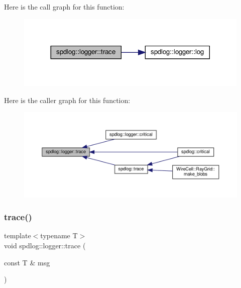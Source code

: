 Here is the call graph for this function\+:
\nopagebreak
\begin{figure}[H]
\begin{center}
\leavevmode
\includegraphics[width=317pt]{classspdlog_1_1logger_a59a8516fe055c6b78c9b1822148f78ec_cgraph}
\end{center}
\end{figure}
Here is the caller graph for this function\+:
\nopagebreak
\begin{figure}[H]
\begin{center}
\leavevmode
\includegraphics[width=350pt]{classspdlog_1_1logger_a59a8516fe055c6b78c9b1822148f78ec_icgraph}
\end{center}
\end{figure}
\mbox{\label{classspdlog_1_1logger_a66e008d30a46c33283c4546f3851a80a}} 
\subsubsection{\texorpdfstring{trace()}{trace()}\hspace{0.1cm}{\footnotesize\ttfamily [2/2]}}
{\footnotesize\ttfamily template$<$typename T$>$ \\
void spdlog\+::logger\+::trace (\begin{DoxyParamCaption}\item[{const T \&}]{msg }\end{DoxyParamCaption})\hspace{0.3cm}{\ttfamily [inline]}}



